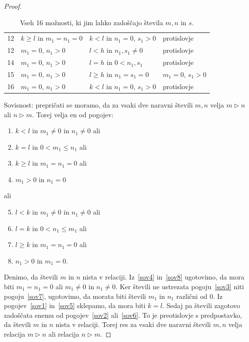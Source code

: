 \documentclass[../TG_magistrsko_delo_sections.tex]{subfiles}
\begin{document}
\begin{proof}
\begin{table}[h!]
\begin{tabular}{||c | l | l | l||}
 12 & $k \geq l$ in $m_1 = n_1 = 0$ & $k<l$ in $n_1 = 0$, $s_1 > 0$ & protislovje \\
 12 & $m_1 = 0$, $n_1 > 0$ & $l<h$ in $n_1, s_1 \neq 0$ & protislovje \\ 
 14 & $m_1 = 0$, $n_1 > 0$ & $l=h$ in $0<n_1, s_1$ & protislovje \\
 15 & $m_1 = 0$, $n_1 > 0$ & $l \geq h$ in $n_1 = s_1 = 0$ & $m_1 = 0$, $s_1 > 0$ \\
 16 & $m_1 = 0$, $n_1 > 0$ & $k<l$ in $n_1 = 0$, $s_1 > 0$ & protislovje \\[1ex] 
 \hline
\end{tabular}
\caption{Vseh 16 možnosti, ki jim lahko zadoščajo števila $m, n$ in $s$.}
\label{table:1}
\end{table}

Sovisnost: prepričati se moramo, da za vsaki dve naravni števili $m, n$ velja $m \triangleright n$ ali $n \triangleright m$. Torej velja en od pogojev:
\begin{enumerate}[label={(\roman*)}]
\item $k<l$ in $m_1 \neq 0$ in $n_1 \neq 0$ ali \label{sov1}
\item $k=l$ in $0<m_1 \leq n_1$ ali \label{sov2}
\item $k \geq l$ in $m_1 = n_1=0$ ali \label{sov3}
\item $m_1>0$ in $n_1 =0$ \label{sov4}
\end{enumerate}
ali 
\begin{enumerate}[label={(\roman*)}]
\setcounter{enumi}{4}
\item $l<k$ in $m_1 \neq 0$ in $n_1 \neq 0$ ali \label{sov5}
\item $l=k$ in $0<n_1 \leq m_1$ ali \label{sov6}
\item $l \geq k$ in $m_1 = n_1=0$ ali \label{sov7}
\item $n_1>0$ in $m_1 =0$. \label{sov8}
\end{enumerate}
Denimo, da števili $m$ in $n$ nista v relaciji. Iz~\ref{sov4} in~\ref{sov8} ugotovimo, da mora biti $m_1 = n_1 = 0$ ali $m_1 \neq 0$ in $n_1 \neq 0$. Ker števili ne ustrezata pogoju~\ref{sov3} niti pogoju~\ref{sov7}, ugotovimo, da morata biti števili $m_1$ in $n_1$ različni od 0. Iz pogojev~\ref{sov1} in~\ref{sov5} sklepamo, da mora biti $k=l$. Sedaj pa števili zagotovo zadoščata enemu od pogojev~\ref{sov2} ali~\ref{sov6}. To je preotislovje s predpostavko, da števili $m$ in $n$ nista v relaciji. Torej res za vsaki dve naravni števili $m, n$ velja relacija $m \triangleright n$ ali relacija $n \triangleright m$. 
\end{proof}
\fi %
\end{document}
